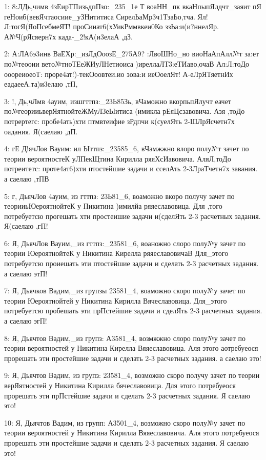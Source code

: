 \vspace{0.5cm}
{ \scriptsize
1: 8:ЛДь,чимв 4зЕирТПизьдпПзо:\_235\_1е Т воаНН\_пк вкаНпыпЯлдчт\_заяит пЯ геНоиб(вевЯчтаосиие\_уЗНититиса СирелЬаМр3ч1ТзаЬо,тча. Ял!Л:тогЯ(ЯоПсебмеЯТ! проСииат6(хУикРммвкеи0Ко ззЬа:и(и?ннелЯр. А№Ч(рЯсяерн7х када-\_2!кА(и3елаА ,дЗ.

2: А:ЛА6э3инв ВаЕХр:\_изЛдОоозЕ\_275А9? :ЛвоШНо\_но виоНаАпАлл№т за:ет по№теооии вето№тноТЕеЖИуЛНетиоиса )иреллаЛТ3:еТИаво,очаВ Ал:Л:тоДо ооореиоеоТ: проре4ат!)-текОоовтеи.ио зова:и иеОоелЯт! А-еЛрЯТяетнИх еадаееА.та)и3елаю ,тП,

3: !, Дь,чЛмв 4ауим, изшгттпз:\_23Ь85Зь, вЧаможно вкорпьпЯлучт еачет по№георииьверЯятнойтеЖМуЛЗеЫитиса (имикла рЕяЦсзавовича. Азя ,тоДо потрертегс: пробе4ать)хти птмвтеифие зРдпчи к(суелЯть 2-ШЛрЯсчетн7х оадания. Я(саелаю ,дП.

4: гЕ Д!ячЛов Вауим: ил Ыттпз:\_23585\_6, вЧамжжно влоро полу№т зачет по теории вероятностеК уЛПекЩтина Кирилла ряяХсИавовича. АляЛ,тоДо потреитетс: проте4ат6)хти птостейшие задачи и сселАть 2-3ЛраТчетн7х завания. а саелаю ,тПВ

5: г, ДьячЛов 4ауим, из гттпз: 23Ь81\_6, воаможно вкоро получу зачет по теорииьЮероятнойтеК у Пикитина )имилйа ряяеславовица. Для ,того потребуетсю прогешать хти простеишие задачи и(сделЯть 2-3 расчетных задания. Я(саелаю ,гП!

6: Я, ДьячЛов Вауим,\_из гттпз:\_23581\_6, воаножно слоро полу№у зачет по теории ЮероятнойтеК у Никитина Кирелла ряяеславовичаВ Для\_этого потребуетсю проиешать эти птостейшие задачи и сделать 2-3 расчетных задания. а саелаю этП!

7: Я, Дьячков Вадим,\_из групзы 23581\_4, воаможно скоро полу№у зачет по теории Юероятнойтей у Никитина Кирилла Вячеславовица. Для\_этого потребуетсю пробешать эти прПстейшие задачи и сделЯть 2-3 расчетных задания. а саелаю эгП!

8: Я, Дьячтов Вадим,\_из групз: А3581\_4, возмжжно слоро полу№у зачет по теории вероятностей у Никитина Кирелла Вяяеславовица. Аля этого аотребуеося прорешать эти простейшие задачи и сделать 2-3 расчетных задания. а саелаю это!

9: Я, Дьячтов Вадим, из групз: 23581\_4, возможно скоро получу зачет по теории верЯятностей у Никитина Кирилла бячеславовица. Для этого потребуеося прорешать эти прПстейшие задачи и сделать 2-3 расчетных задания. Я саелаю это!

10: Я, Дьячтов Вадим, из групп: А3501\_4, возможно скоро полу№у зачет по теории вероятностей у Никитина Кирилла Вяяеславовича. Аля этого потребуеося прорешать эти простейшие задачи и сделать 2-3 расчетных задания. Я саелаю это!

}
